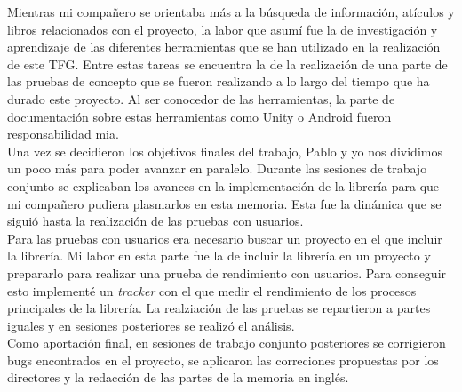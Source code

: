 Mientras mi compa\~nero se orientaba m\'as a la b\'usqueda de informaci\'on, at\'iculos y libros relacionados con el proyecto, la labor que asum\'i fue la de investigaci\'on y aprendizaje de las diferentes herramientas que se han utilizado en la realizaci\'on de este TFG. Entre estas tareas se encuentra la de la realizaci\'on de una parte de las pruebas de concepto que se fueron realizando a lo largo del tiempo que ha durado este proyecto. Al ser conocedor de las herramientas, la parte de documentaci\'on sobre estas herramientas como Unity o Android fueron responsabilidad mia.\\

Una vez se decidieron los objetivos finales del trabajo, Pablo y yo nos dividimos un poco m\'as para poder avanzar en paralelo. Durante las sesiones de trabajo conjunto se explicaban los avances en la implementaci\'on de la librer\'ia para que mi compa\~nero pudiera plasmarlos en esta memoria. Esta fue la din\'amica que se sigui\'o hasta la realizaci\'on de las pruebas con usuarios.\\

Para las pruebas con usuarios era necesario buscar un proyecto en el que incluir la librer\'ia. Mi labor en esta parte fue la de incluir la librer\'ia en un proyecto y prepararlo para realizar una prueba de rendimiento con usuarios. Para conseguir esto implement\'e un \textit{tracker} con el que medir el rendimiento de los procesos principales de la librer\'ia. La realziaci\'on de las pruebas se repartieron a partes iguales y en sesiones posteriores se realiz\'o el an\'alisis. \\

Como aportaci\'on final, en sesiones de trabajo conjunto posteriores se corrigieron bugs encontrados en el proyecto, se aplicaron las correciones propuestas por los directores y la redacci\'on de las partes de la memoria en ingl\'es. 